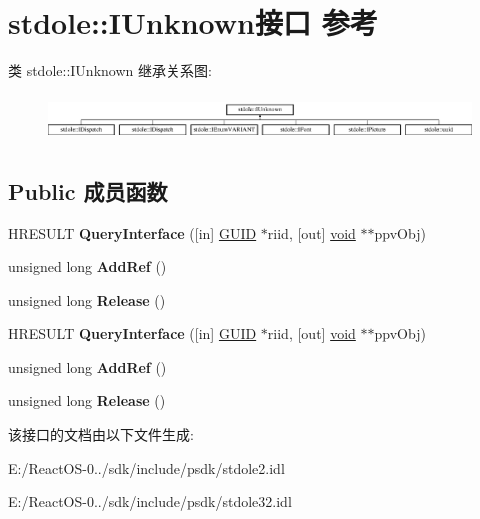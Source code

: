 \hypertarget{interfacestdole_1_1_i_unknown}{}\section{stdole\+:\+:I\+Unknown接口 参考}
\label{interfacestdole_1_1_i_unknown}
类 stdole\+:\+:I\+Unknown 继承关系图\+:\begin{figure}[H]
\begin{center}
\leavevmode
\includegraphics[height=1.269841cm]{interfacestdole_1_1_i_unknown}
\end{center}
\end{figure}
\subsection*{Public 成员函数}
\begin{DoxyCompactItemize}
\item 
\mbox{\label{interfacestdole_1_1_i_unknown_ad8b00cb972900ee40a3220a68934d774}} 
H\+R\+E\+S\+U\+LT {\bfseries Query\+Interface} (\mbox{[}in\mbox{]} \hyperlink{structstdole_1_1_g_u_i_d}{G\+U\+ID} $\ast$riid, \mbox{[}out\mbox{]} \hyperlink{interfacevoid}{void} $\ast$$\ast$ppv\+Obj)
\item 
\mbox{\label{interfacestdole_1_1_i_unknown_a6644708764488aa19406a2d607e96947}} 
unsigned long {\bfseries Add\+Ref} ()
\item 
\mbox{\label{interfacestdole_1_1_i_unknown_aa6d0b0c8a42100f17e44186254a50cf8}} 
unsigned long {\bfseries Release} ()
\item 
\mbox{\label{interfacestdole_1_1_i_unknown_ad8b00cb972900ee40a3220a68934d774}} 
H\+R\+E\+S\+U\+LT {\bfseries Query\+Interface} (\mbox{[}in\mbox{]} \hyperlink{structstdole_1_1_g_u_i_d}{G\+U\+ID} $\ast$riid, \mbox{[}out\mbox{]} \hyperlink{interfacevoid}{void} $\ast$$\ast$ppv\+Obj)
\item 
\mbox{\label{interfacestdole_1_1_i_unknown_a6644708764488aa19406a2d607e96947}} 
unsigned long {\bfseries Add\+Ref} ()
\item 
\mbox{\label{interfacestdole_1_1_i_unknown_aa6d0b0c8a42100f17e44186254a50cf8}} 
unsigned long {\bfseries Release} ()
\end{DoxyCompactItemize}


该接口的文档由以下文件生成\+:\begin{DoxyCompactItemize}
\item 
E\+:/\+React\+O\+S-\/0../sdk/include/psdk/stdole2.\+idl\item 
E\+:/\+React\+O\+S-\/0../sdk/include/psdk/stdole32.\+idl\end{DoxyCompactItemize}
